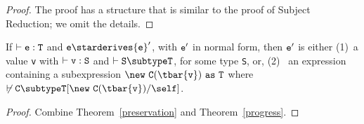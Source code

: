 \begin{proof}
The proof has a structure that is similar to the proof of Subject Reduction;
we omit the details.
\end{proof}

\begin{theorem} 
\label{type-soundness}
If $\vdash {\tt e: T}$ and ${\tt e} \starderives {\tt e}'$, with ${\tt
e}'$ in normal form, then ${\tt e}'$ is either (1)~a value {\tt v}
with $\vdash {\tt v: S}$ and $\vdash {\tt S \subtype T}$,
for some type {\tt S}, or, (2)~ an expression containing
a subexpression ${\tt \new\ {\tt C(\tbar{v})~as~T}}$ where 
$\not\vdash \tt C\subtype T[\new\ C(\tbar{v})/\self]$.

\end{theorem}

\begin{proof}
Combine Theorem~\ref{preservation} and Theorem~\ref{progress}.
\end{proof}

